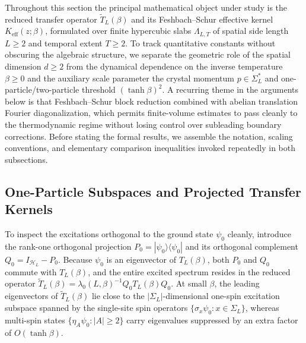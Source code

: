 \documentclass[11pt]{article}
\theoremstyle{definition}
\begin{document}
Throughout this section the principal mathematical object under study is the reduced
transfer operator $\widetilde{T}_L(\beta)$ and its Feshbach--Schur effective kernel
$K_{\mathrm{eff}}(z; \beta)$, formulated over finite hypercubic slabs
$\Lambda_{L,T}$ of spatial side length $L \ge 2$ and temporal extent $T \ge 2$. To
track quantitative constants without obscuring the algebraic structure, we separate
the geometric role of the spatial dimension $d \ge 2$ from the dynamical dependence
on the inverse temperature $\beta \ge 0$ and the auxiliary scale parameter the
crystal momentum $p \in \Sigma_L^*$ and one-particle/two-particle threshold $(\tanh
\beta)^2$. A recurring theme in the arguments below is that Feshbach--Schur block
reduction combined with abelian translation Fourier diagonalization, which permits
finite-volume estimates to pass cleanly to the thermodynamic regime without losing
control over subleading boundary corrections. Before stating the formal results, we
assemble the notation, scaling conventions, and elementary comparison inequalities
invoked repeatedly in both subsections.

\subsection{One-Particle Subspaces and Projected Transfer Kernels}
\label{subsec:s07a}

To inspect the excitations orthogonal to the ground state $\psi_0$ cleanly,
introduce the rank-one orthogonal projection $P_0 = |\psi_0\rangle \langle \psi_0|$
and its orthogonal complement $Q_0 = I_{\mathcal{H}_L} - P_0$. Because $\psi_0$ is
an eigenvector of $T_L(\beta)$, both $P_0$ and $Q_0$ commute with $T_L(\beta)$, and
the entire excited spectrum resides in the reduced operator $\widetilde{T}_L(\beta)
= \lambda_0(L, \beta)^{-1} Q_0 T_L(\beta) Q_0$. At small $\beta$, the leading
eigenvectors of $\widetilde{T}_L(\beta)$ lie close to the $|\Sigma_L|$-dimensional
one-spin excitation subspace spanned by the single-site spin operators $\{\sigma_x
\psi_0 : x \in \Sigma_L\}$, whereas multi-spin states $\{\eta_A \psi_0 : |A| \ge
2\}$ carry eigenvalues suppressed by an extra factor of $O(\tanh \beta)$.
\end{document}
